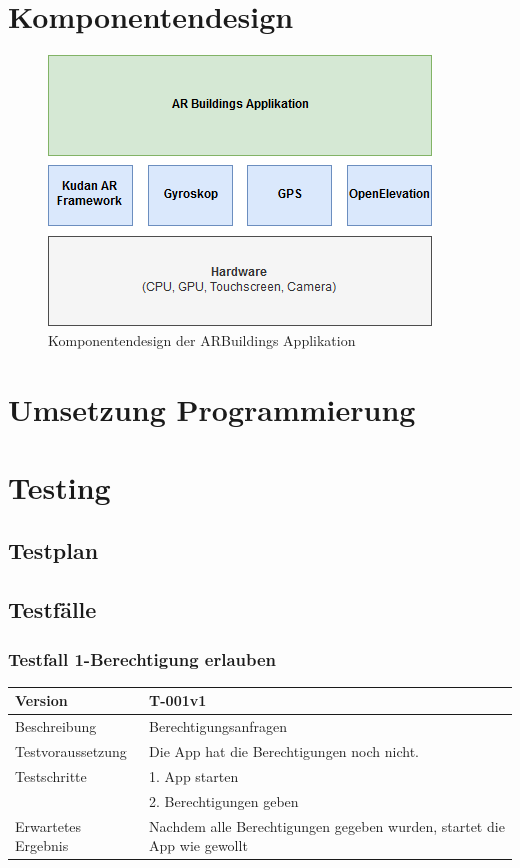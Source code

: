 \documentclass[a4paper]{scrreprt}
\begin{document}
\newpage
\section{Komponentendesign}

\begin{figure}[h!]
	\centering
	\includegraphics[width=0.7\linewidth, keepaspectratio]{Komponentendesign}
	\caption{Komponentendesign der ARBuildings Applikation}
\end{figure}

\section{Umsetzung Programmierung}

\section{Testing}

\subsection{Testplan}

\subsection{Testfälle}
\subsubsection{Testfall 1-Berechtigung erlauben}
\begin{tabularx}{\textwidth}{|l|X|}
\hline 
	Version &
	T-001v1 \\ 
\hline 
	Beschreibung & Berechtigungsanfragen \\ 
\hline 
	Testvoraussetzung & Die App hat die Berechtigungen noch nicht. \\ 
\hline 
	Testschritte &
		1. App starten \\ &
		2. Berechtigungen geben \\
\hline
	Erwartetes Ergebnis & Nachdem alle Berechtigungen gegeben wurden, startet die App wie gewollt \\ 
\hline 
\end{tabularx}
\end{document}
